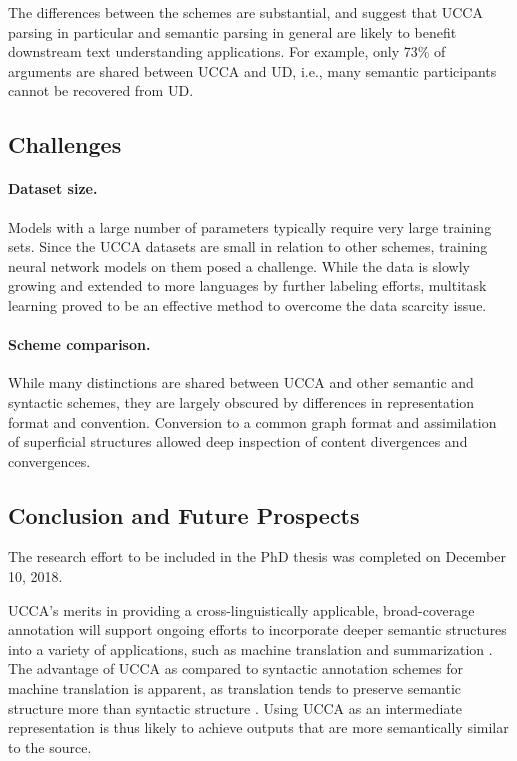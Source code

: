 \documentclass[12pt,a4paper]{report}
\begin{document}
  The differences between the schemes are substantial, and suggest that
  UCCA parsing in particular and semantic parsing in general are likely to benefit
  downstream text understanding applications.
  For example, only 73\% of arguments are shared between UCCA and UD,
  i.e., many semantic participants cannot be recovered from UD.

\subsection*{Challenges}

\paragraph{Dataset size.}
Models with a large number of parameters typically require very large
training sets.
Since the UCCA datasets are small in relation to other schemes,
training neural network models on them posed a challenge.
While the data is slowly growing and extended to more languages by further labeling efforts,
multitask learning proved to be an effective method to overcome the data scarcity issue.

\paragraph{Scheme comparison.}
While many distinctions are shared between UCCA and other semantic and syntactic schemes,
they are largely obscured by differences in representation format and convention.
Conversion to a common graph format and assimilation of superficial structures
allowed deep inspection of content divergences and convergences.


\subsection*{Conclusion and Future Prospects}

The research effort to be included in the PhD thesis was completed on December 10, 2018.

UCCA's merits in providing a cross-linguistically applicable,
broad-coverage annotation will support ongoing efforts to incorporate deeper
semantic structures into a variety of applications, such as machine translation
\citep{jones2012semantics} and summarization \citep{liu2015toward}.
The advantage of UCCA as compared to syntactic annotation schemes for machine translation is apparent,
as translation tends to preserve semantic structure more than syntactic structure \citep{sulem2015conceptual}.
Using UCCA as an intermediate representation is thus likely to achieve outputs that are more
semantically similar to the source.
\end{document}
